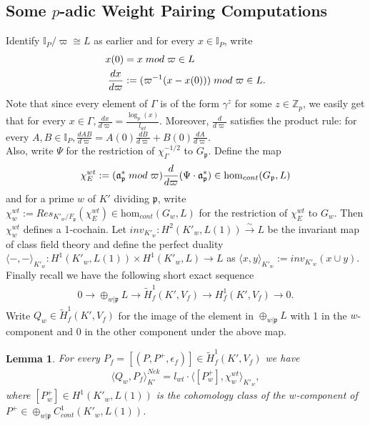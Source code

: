\documentclass[reqno,10pt]{amsart}
\newcommand{\zp}{\mathbb{Z}_{p}}
\newcommand{\I}{\mathbb{I}}
\newcommand{\ma}{\mathfrak{a}}
\newcommand{\p}{\mathfrak{p}}
\newcommand{\vp}{\varpi}
\theoremstyle{plain}
\newtheorem{lem}[thm]{Lemma}
\theoremstyle{definition}
\begin{document}
\subsection{Some $p$-adic Weight Pairing Computations}
Identify $\I_P/\vp \cong L$ as earlier and for every $x \in \I_P$, write
\begin{align*}
    x(0) & = x \hspace{1mm} mod \hspace{1mm} \vp \in L \\
    \frac{dx}{d\vp} & := (\vp^{-1}(x-x(0))) \hspace{1mm} mod \hspace{1mm} \vp \in L.
\end{align*}
Note that since every element of $\Gamma$ is of the form $\gamma^z$ for some $z \in \zp$, we easily get that for every $x \in \Gamma, \frac{dx}{d\vp} = \frac{\log_p(x)}{l_{wt}}$. Moreover, $\frac{d}{d\vp}$ satisfies the product rule: for every $A,B \in \I_P, \frac{dAB}{d\vp} = A(0)\frac{dB}{d\vp} + B(0)\frac{dA}{d\vp}$.
\\
Also, write $\Psi$ for the restriction of $\chi_\Gamma^{-1/2}$ to $G_\p$. Define the map
\begin{align*}
    \chi_E^{wt} := (\ma_\p^* \hspace{1mm} mod \hspace{1mm} \vp) \frac{d}{d\vp}(\Psi \cdot \ma_\p^*) \in \mathrm{hom}_{cont}(G_\p,L)
\end{align*}
and for a prime $w$ of $K'$ dividing $\p$, write $\chi_w^{wt} := Res_{K'_w/F_\p}(\chi_E^{wt}) \in \mathrm{hom}_{cont}(G_w,L)$ for the restriction of $\chi_E^{wt}$ to $G_w$. Then $\chi_w^{wt}$ defines a 1-cochain. Let $inv_{K'_w} : H^2(K'_w,L(1)) \xrightarrow{\sim} L$ be the invariant map of class field theory and define the perfect duality $\langle -,- \rangle_{K'_w} : H^1(K'_w,L(1)) \times H^1(K'_w,L) \rightarrow L$ as $\langle x,y \rangle_{K'_w} := inv_{K'_w}(x \cup y)$. Finally recall we have the following short exact sequence
\begin{align*}
    0 \rightarrow \oplus_{w|\p} L \rightarrow \widetilde{H}^1_f(K',V_f) \rightarrow H^1_f(K',V_f) \rightarrow 0.
\end{align*}
Write $Q_w \in \widetilde{H}^1_f(K',V_f)$ for the image of the element in $\oplus_{w|\p} L$ with 1 in the $w$-component and 0 in the other component under the above map.

\begin{lem} \label{lem7.7}
    For every $P_f = [(P,P^+,\epsilon_f)] \in \widetilde{H}^1_f(K',V_f)$ we have
    \begin{align*}
        \langle Q_w, P_f \rangle^{Nek}_{K'} = l_{wt} \cdot \langle [P_w^+],\chi_w^{wt} \rangle_{K'_w},
    \end{align*}
    where $[P_w^+] \in H^1(K'_w,L(1))$ is the cohomology class of the $w$-component of $P^+ \in \oplus_{w|\p} C^1_{cont}(K'_w,L(1))$.
\end{lem}
\end{document}

